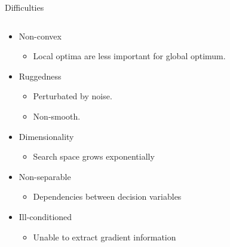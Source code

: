 \begin{frame}{Difficulties}
  \begin{columns}
    \begin{column}{0.6\textwidth}
      \begin{itemize}[<+->]
        \item Non-convex
          \begin{itemize}
            \item Local optima are less important for global optimum.
          \end{itemize}
        \item Ruggedness
          \begin{itemize}  
            \item Perturbated by noise. 
            \item Non-smooth.
          \end{itemize}
        \item Dimensionality
          \begin{itemize}
            \item Search space grows exponentially
          \end{itemize}
        \item Non-separable
          \begin{itemize}
            \item Dependencies between decision variables
          \end{itemize}
        \item Ill-conditioned
          \begin{itemize}
            \item Unable to extract gradient information
          \end{itemize}
      \end{itemize}
    \end{column}
    \begin{column}{0.4\textwidth}
    \end{column}
  \end{columns}
\end{frame}
